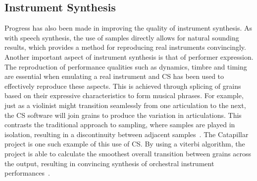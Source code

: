 \documentclass{scrartcl}
\begin{document}
    \subsection*{Instrument Synthesis}
    Progress has also been made in improving the quality of instrument
    synthesis. As with speech synthesis, the use of samples directly allows for
    natural sounding results, which provides a method for reproducing real
    instruments convincingly. Another important aspect of instrument synthesis is that of performer
    expression. The reproduction of performance qualities such as dynamics,
    timbre and timing are essential when emulating a real instrument and CS has
    been used to effectively reproduce these aspects. This is achieved through
    splicing of grains based on their expressive characteristics to form
    musical phrases.  For example, just as a violinist might transition
    seamlessly from one articulation to the next, the CS software will join
    grains to produce the variation in articulations. This contrasts the
    traditional approach to sampling, where samples are played in isolation,
    resulting in a discontinuity between adjacent samples~\parencite[p.82]{Lindemann2007}. 
    The Catapillar project is one such example of this use of CS. 
    By using a viterbi algorithm, the project is able to calculate the
    smoothest overall transition between grains across the output, resulting
    in convincing synthesis of orchestral instrument performances~\parencite[p.5]{Schwarz2003}.
\end{document}
